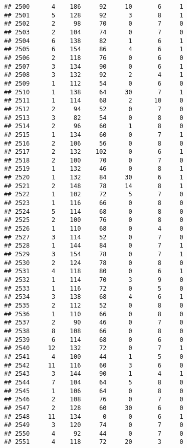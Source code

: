 \documentclass[
]{article}
\begin{document}
\begin{verbatim}
## 2500      4    186     92     10       6     1
## 2501      5    128     92      3       8     1
## 2502      2     98     70      0       7     0
## 2503      2    104     74      0       7     0
## 2504      6    138     82      1       6     1
## 2505      6    154     86      4       6     1
## 2506      2    118     76      0       6     0
## 2507      3    134     90      0       6     1
## 2508      3    132     92      2       4     1
## 2509      1    112     54      0       6     0
## 2510      1    138     64     30       7     1
## 2511      1    114     68      2      10     0
## 2512      2     94     52      0       7     0
## 2513      3     82     54      0       8     0
## 2514      2     96     60      1       8     0
## 2515      1    134     60      0       7     1
## 2516      2    106     56      0       8     0
## 2517      2    132    102      0       6     1
## 2518      2    100     70      0       7     0
## 2519      1    132     46      0       8     1
## 2520      1    132     84     30       6     1
## 2521      2    148     78     14       8     1
## 2522      1    102     72      5       7     0
## 2523      1    116     66      0       8     0
## 2524      5    114     68      0       8     0
## 2525      2    100     76      0       8     0
## 2526      1    110     68      0       4     0
## 2527      3    114     52      0       7     0
## 2528      1    144     84      0       7     1
## 2529      3    154     78      0       7     1
## 2530      2    124     78      0       8     0
## 2531      4    118     80      0       6     1
## 2532      1    114     70      3       9     0
## 2533      1    116     72      0       5     0
## 2534      3    138     68      4       6     1
## 2535      2    112     52      0       8     0
## 2536      1    110     66      0       8     0
## 2537      2     90     46      0       7     0
## 2538      8    108     66      0       8     0
## 2539      6    114     68      0       6     0
## 2540     12    132     72      0       7     1
## 2541      4    100     44      1       5     0
## 2542     11    116     60      3       6     0
## 2543      3    144     90      1       4     1
## 2544      7    104     64      5       8     0
## 2545      1    106     64      0       8     0
## 2546      2    108     76      0       7     0
## 2547      2    128     60     30       6     0
## 2548     11    134      0      0       6     1
## 2549      3    120     74      0       7     0
## 2550      4     92     44      0       7     0
## 2551      4    118     72     20       3     0

\end{verbatim}
\end{document}
